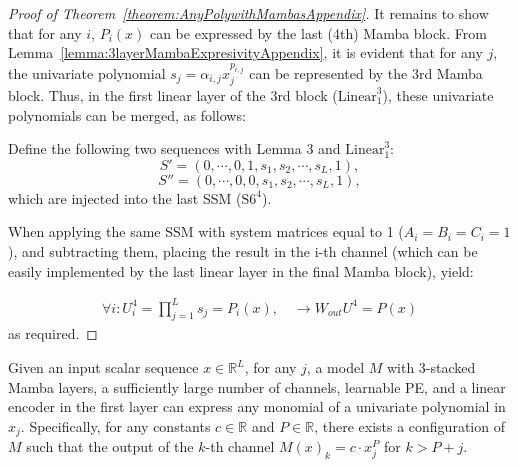 \begin{proof}[Proof of Theorem~\ref{theorem:AnyPolywithMambasAppendix}]
It remains to show that for any \( i \), \( P_i(x) \) can be expressed by the last (4th) Mamba block. From Lemma~\ref{lemma:3layerMambaExpresivityAppendix}, it is evident that for any \( j \), the univariate polynomial \( s_j = \alpha_{i,j} x_j^{p_{i,j}} \) can be represented by the 3rd Mamba block. Thus, in the first linear layer of the 3rd block (\( \text{Linear}_1^3 \)), these univariate polynomials can be merged, as follows:


Define the following two sequences with Lemma 3 and $ \text{Linear}_1^3$:
\[
S' = (0, \cdots, 0, 1, s_1, s_2, \cdots, s_L, 1),
\]
\[
S'' = (0, \cdots, 0, 0, s_1, s_2, \cdots, s_L, 1),
\]
which are injected into the last SSM (\( \text{S6}^4 \)).

When applying the same SSM with system matrices equal to 1 (\( A_i = B_i = C_i = 1 \)), and subtracting them, placing the result in the i-th channel (which can be easily implemented by the last linear layer in the final Mamba block), yield:

\begin{align}
\forall i: U^{4}_i = \prod_{j=1}^L s_j = P_i(x), \quad \rightarrow W_{out}U^4 = P(x)
\end{align} 
as required.
\end{proof}


\begin{lemma}\label{lemma:3layerMambaExpresivityAppendix}
Given an input scalar sequence $x \in \mathbb{R}^L$, for any $j$, a model $M$ with 3-stacked Mamba layers, a sufficiently large number of channels, learnable PE, and a linear encoder in the first layer can express any monomial of a univariate polynomial in $x_j$. Specifically, for any constants $c \in \mathbb{R}$ and $P \in \mathbb{R}$, there exists a configuration of $M$ such that the output of the $k$-th channel $M(x)_k = c \cdot x_j^P$ for $k > P + j$.
\end{lemma}



